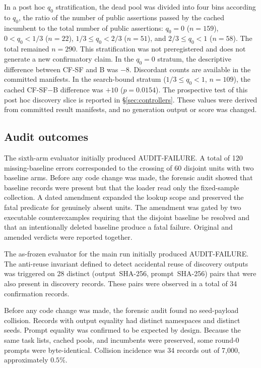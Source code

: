\documentclass{article}
\numberwithin{equation}{section}  %
\theoremstyle{definition}
\newcommand{\armB}{\textsf{B}}
\newcommand{\armCF}{\textsf{CF-SF}}
\begin{document}
In a post hoc $q_0$ stratification, the dead pool was divided into four bins according to
$q_0$, the ratio of the number of public assertions passed by the cached incumbent to the
total number of public assertions: $q_0{=}0$ ($n{=}159$), $0{<}q_0{<}1/3$ ($n{=}22$),
$1/3{\le}q_0{<}2/3$ ($n{=}51$), and $2/3{\le}q_0{<}1$ ($n{=}58$). The total remained
$n=290$. This stratification was not preregistered and does not generate a new confirmatory
claim. In the $q_0{=}0$ stratum, the descriptive difference between \armCF{} and \armB{} was
$-8$. Discordant counts are available in the committed manifests. In the search-bound stratum
($1/3{\le}q_0{<}1$, $n{=}109$), the cached \armCF{}$-$\armB{} difference was $+10$
($p{=}0.0154$). The prospective test of this post hoc discovery slice is reported in
\S\ref{sec:controllers}. These values were derived from committed result manifests, and no
generation output or score was changed.

\subsection{Audit outcomes}
\label{sec:audit}

The sixth-arm evaluator initially produced AUDIT-FAILURE. A total of 120 missing-baseline
errors corresponded to the crossing of 60 disjoint units with two baseline arms. Before any
code change was made, the forensic audit showed that baseline records were present but that
the loader read only the fixed-sample collection. A dated amendment expanded the lookup scope
and preserved the fatal predicate for genuinely absent units. The amendment was gated by two
executable counterexamples requiring that the disjoint baseline be resolved and that an
intentionally deleted baseline produce a fatal failure. Original and amended verdicts were
reported together.

The as-frozen evaluator for the main run initially produced AUDIT-FAILURE. The anti-reuse
invariant defined to detect accidental reuse of discovery outputs was triggered on 28 distinct
(output~SHA-256, prompt~SHA-256) pairs that were also present in discovery records. These
pairs were observed in a total of 34 confirmation records.

Before any code change was made, the forensic audit found no seed-payload collision. Records
with output equality had distinct namespaces and distinct seeds. Prompt equality was confirmed
to be expected by design. Because the same task lists, cached pools, and incumbents were
preserved, some round-0 prompts were byte-identical. Collision incidence was 34 records out of
7{,}000, approximately $0.5\%$.
\end{document}
